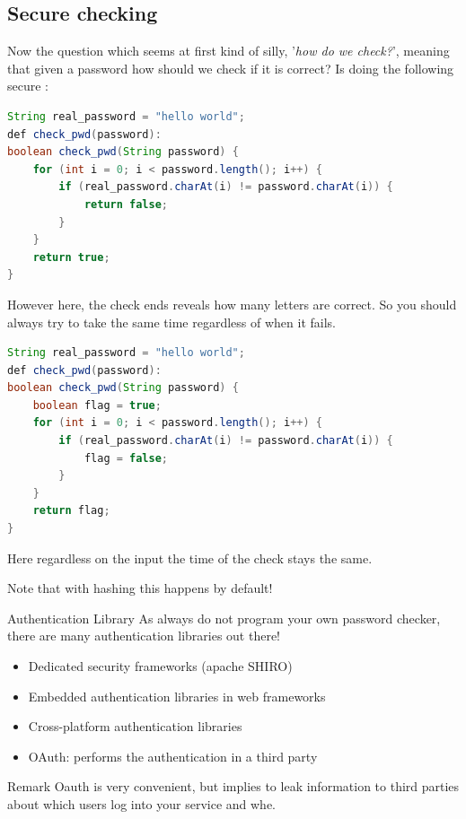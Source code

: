 \subsection{Secure checking}
Now the question which seems at first kind of silly, '\textit{how do we check?}', meaning that given a password how should we check if it is correct? Is doing the following secure :
\begin{lstlisting}[language=Java]
String real_password = "hello world";
def check_pwd(password):
boolean check_pwd(String password) {
	for (int i = 0; i < password.length(); i++) {
		if (real_password.charAt(i) != password.charAt(i)) {
			return false;
		}
	}
	return true;
}
\end{lstlisting}
However here, the check ends reveals how many letters are correct. So you should always try to take the same time regardless of when it fails.
    

\begin{lstlisting}[language=Java]
String real_password = "hello world";
def check_pwd(password):
boolean check_pwd(String password) {
	boolean flag = true;
	for (int i = 0; i < password.length(); i++) {
		if (real_password.charAt(i) != password.charAt(i)) {
			flag = false;
		}
	}
	return flag;
}
\end{lstlisting}
Here regardless on the input the time of the check stays the same. 
\begin{framedremark}
Note that with hashing this happens by default!
\end{framedremark}

\begin{parag}{Authentication Library}
    As always do not program your own password checker, there are many authentication libraries out there!
	\begin{itemize}
	    \item Dedicated security frameworks (apache SHIRO)
	    \item Embedded authentication libraries in web frameworks
	    \item Cross-platform authentication libraries 
	    \item OAuth: performs the authentication in a third party
	\end{itemize}
	
	\begin{subparag}{Remark}
	    Oauth is very convenient, but implies to leak information to third parties about which users log into your service and whe.
	\end{subparag}
\end{parag}

